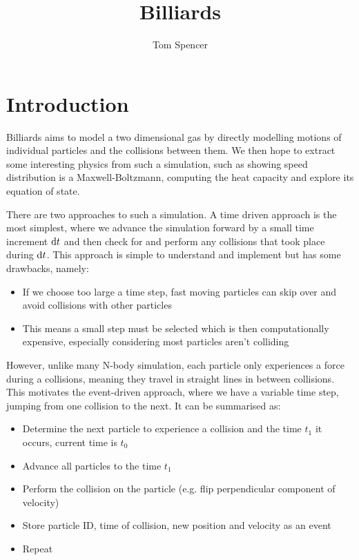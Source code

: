 \documentclass{article}
\title{Billiards}
\author{Tom Spencer}
\newcommand{\diff}{\textnormal{d}}
\begin{document}
\maketitle

\section{Introduction}
Billiards aims to model a two dimensional gas by directly modelling motions of individual particles and the collisions between them. We then hope to extract some interesting physics from such a simulation, such as showing speed distribution is a Maxwell-Boltzmann, computing the heat capacity and explore its equation of state.

There are two approaches to such a simulation. A time driven approach is the most simplest, where we advance the simulation forward by a small time increment $\diff t$ and then check for and perform any collisions that took place during $\diff t$. This approach is simple to understand and implement but has some drawbacks, namely:
\begin{itemize}
    \item If we choose too large a time step, fast moving particles can skip over and avoid collisions with other particles
    \item This means a small step must be selected which is then computationally expensive, especially considering most particles aren't colliding
\end{itemize}

However, unlike many N-body simulation, each particle only experiences a force during a collisions, meaning they travel in straight lines in between collisions. This motivates the event-driven approach, where we have a variable time step, jumping from one collision to the next. It can be summarised as:
\begin{itemize}
    \item Determine the next particle to experience a collision and the time $t_1$ it occurs, current time is $t_0$
    \item Advance all particles to the time $t_1$
    \item Perform the collision on the particle (e.g. flip perpendicular component of velocity)
    \item Store particle ID, time of collision, new position and velocity as an event
    \item Repeat
\end{itemize}
\end{document}
